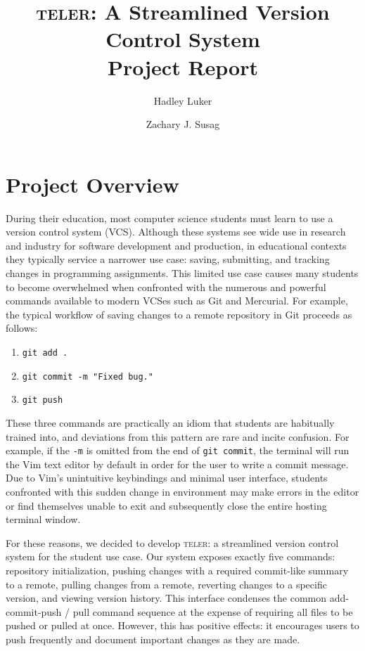 \documentclass[12pt, letterpaper]{article}
\begin{document}
\title{
  \textsc{teler}: A Streamlined Version Control System\\
  \large Project Report
}

\author{
  Hadley Luker \and Zachary J. Susag
}

\maketitle

\section{Project Overview}
\label{sec:overview}

During their education, most computer science students must learn to use a
version control system (VCS). Although these systems see wide use in research
and industry for software development and production, in educational contexts
they typically service a narrower use case: saving, submitting, and tracking
changes in programming assignments. This limited use case causes many students
to become overwhelmed when confronted with the numerous and powerful commands
available to modern VCSes such as Git and Mercurial. For example, the typical
workflow of saving changes to a remote repository in Git proceeds as follows:

\begin{enumerate}
  \item \texttt{git add .}
  \item \texttt{git commit -m "Fixed bug."}
  \item \texttt{git push}
\end{enumerate}

These three commands are practically an idiom that students are habitually
trained into, and deviations from this pattern are rare and incite confusion.
For example, if the \texttt{-m} is omitted from the end of \texttt{git commit},
the terminal will run the Vim text editor by default in order for the user to
write a commit message. Due to Vim's unintuitive keybindings and minimal user
interface, students confronted with this sudden change in environment may make
errors in the editor or find themselves unable to exit and subsequently close
the entire hosting terminal window.

For these reasons, we decided to develop \textsc{teler}: a streamlined version
control system for the student use case. Our system exposes exactly five
commands: repository initialization, pushing changes with a required commit-like
summary to a remote, pulling changes from a remote, reverting changes to a
specific version, and viewing version history. This interface condenses the
common add-commit-push / pull command sequence at the expense of requiring all
files to be pushed or pulled at once. However, this has positive effects:
it encourages users to push frequently and document important changes as they
are made.
\end{document}
